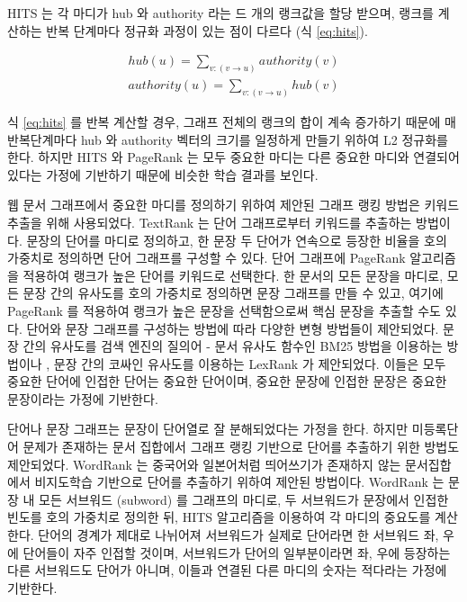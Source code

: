 \documentclass[11pt]{article}
\begin{document}
HITS 는 각 마디가 hub 와 authority 라는 드 개의 랭크값을 할당 받으며, 랭크를 계산하는 반복 단계마다 정규화 과정이 있는 점이 다르다 (식 \ref{eq:hits}).

\begin{equation}
  \label{eq:hits}
  \begin{aligned}
  hub(u) = \sum_{v:(v \rightarrow u)} authority(v) \\
  authority(u) = \sum_{v:(v \rightarrow u)} hub(v)
  \end{aligned}
\end{equation}

식 \ref{eq:hits} 를 반복 계산할 경우, 그래프 전체의 랭크의 합이 계속 증가하기 때문에 매 반복단계마다 hub 와 authority 벡터의 크기를 일정하게 만들기 위하여 L2 정규화를 한다.
하지만 HITS 와 PageRank 는 모두 중요한 마디는 다른 중요한 마디와 연결되어 있다는 가정에 기반하기 때문에 비슷한 학습 결과를 보인다.

웹 문서 그래프에서 중요한 마디를 정의하기 위하여 제안된 그래프 랭킹 방법은 키워드 추출을 위해 사용되었다.
TextRank \citep{mihalcea2004textrank} 는 단어 그래프로부터 키워드를 추출하는 방법이다.
문장의 단어를 마디로 정의하고, 한 문장 두 단어가 연속으로 등장한 비율을 호의 가중치로 정의하면 단어 그래프를 구성할 수 있다.
단어 그래프에 PageRank 알고리즘을 적용하여 랭크가 높은 단어를 키워드로 선택한다.
한 문서의 모든 문장을 마디로, 모든 문장 간의 유사도를 호의 가중치로 정의하면 문장 그래프를 만들 수 있고, 여기에 PageRank 를 적용하여 랭크가 높은 문장을 선택함으로써 핵심 문장을 추출할 수도 있다.
단어와 문장 그래프를 구성하는 방법에 따라 다양한 변형 방법들이 제안되었다.
문장 간의 유사도를 검색 엔진의 질의어 - 문서 유사도 함수인 BM25 \citep{robertson2009probabilistic} 방법을 이용하는 방법이나 \citep{barrios2016variations}, 문장 간의 코싸인 유사도를 이용하는 LexRank \citep{erkan2004lexrank} 가 제안되었다.
이들은 모두 중요한 단어에 인접한 단어는 중요한 단어이며, 중요한 문장에 인접한 문장은 중요한 문장이라는 가정에 기반한다.

단어나 문장 그래프는 문장이 단어열로 잘 분해되었다는 가정을 한다.
하지만 미등록단어 문제가 존재하는 문서 집합에서 그래프 랭킹 기반으로 단어를 추출하기 위한 방법도 제안되었다.
WordRank \citep{chen2011simple} 는 중국어와 일본어처럼 띄어쓰기가 존재하지 않는 문서집합에서 비지도학습 기반으로 단어를 추출하기 위하여 제안된 방법이다.
WordRank 는 문장 내 모든 서브워드 (subword) 를 그래프의 마디로, 두 서브워드가 문장에서 인접한 빈도를 호의 가중치로 정의한 뒤, HITS 알고리즘을 이용하여 각 마디의 중요도를 계산한다.
단어의 경계가 제대로 나뉘어져 서브워드가 실제로 단어라면 한 서브워드 좌, 우에 단어들이 자주 인접할 것이며, 서브워드가 단어의 일부분이라면 좌, 우에 등장하는 다른 서브워드도 단어가 아니며, 이들과 연결된 다른 마디의 숫자는 적다라는 가정에 기반한다.
\end{document}
